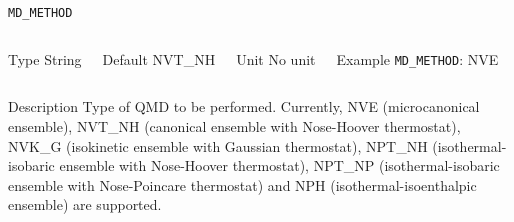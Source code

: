 \begin{frame}[allowframebreaks]{\texttt{MD\_METHOD}} \label{MD_METHOD}
\vspace*{-12pt}
\begin{columns}
\begin{block}{Type}
String
\end{block}

\begin{block}{Default}
NVT\_NH
\end{block}

\begin{block}{Unit}
No unit
\end{block}

\begin{block}{Example}
\texttt{MD\_METHOD}: NVE
\end{block}
\end{columns}

\begin{block}{Description}
Type of QMD to be performed. Currently, NVE (microcanonical ensemble), NVT\_NH (canonical ensemble with Nose-Hoover thermostat), NVK\_G (isokinetic ensemble with Gaussian thermostat), NPT\_NH (isothermal-isobaric ensemble with Nose-Hoover thermostat), NPT\_NP (isothermal-isobaric ensemble with Nose-Poincare thermostat) and NPH (isothermal-isoenthalpic ensemble) are supported.
\end{block}

\end{frame}



